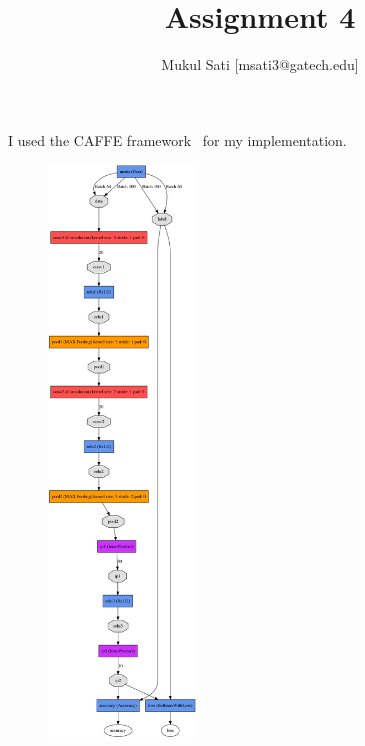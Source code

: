 \documentclass[5pt]{article}
\begin{document}
\title{Assignment 4}
\author{Mukul Sati [msati3@gatech.edu]}
\maketitle

I used the CAFFE framework~\cite{jia2014caffe} for my implementation.

\begin{figure}[T]
  \centering{}
  \includegraphics[width=0.35\textwidth]{images/mnist_arch1.png}

\end{figure}
\end{document}

